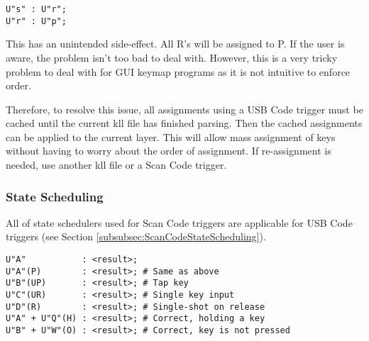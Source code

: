 \documentclass{kiibohd-template}
\begin{document}
\begin{lstlisting}
U"s" : U"r";
U"r" : U"p";
\end{lstlisting}

This has an unintended side-effect.
All R's will be assigned to P.
If the user is aware, the problem isn't too bad to deal with.
However, this is a very tricky problem to deal with for GUI keymap programs as it is not intuitive to enforce order.

Therefore, to resolve this issue, all assignments using a USB Code trigger must be cached until the current kll file has finished parsing.
Then the cached assignments can be applied to the current layer.
This will allow mass assignment of keys without having to worry about the order of assignment.
If re-assignment is needed, use another kll file or a Scan Code trigger.


\subsubsection{State Scheduling}
\label{subsubsec:trigusbstateschedule}

All of state schedulers used for Scan Code triggers are applicable for USB Code triggers (see Section \ref{subsubsec:ScanCodeStateScheduling}).

\begin{lstlisting}
U"A"           : <result>;
U"A"(P)        : <result>; # Same as above
U"B"(UP)       : <result>; # Tap key
U"C"(UR)       : <result>; # Single key input
U"D"(R)        : <result>; # Single-shot on release
U"A" + U"Q"(H) : <result>; # Correct, holding a key
U"B" + U"W"(O) : <result>; # Correct, key is not pressed
\end{lstlisting}






\end{document}
